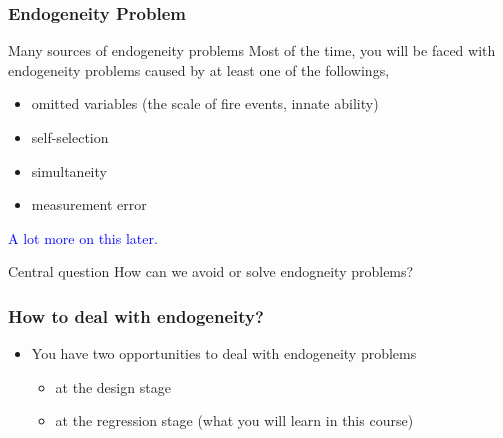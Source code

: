 \documentclass[fleqn]{beamer}\usepackage[]{graphicx}\usepackage[]{color}
\begin{document}
\begin{frame}[c]
  \frametitle{Endogeneity Problem}
  \begin{block}{Many sources of endogeneity problems}
  Most of the time, you will be faced with endogeneity problems caused by at least one of the followings,
  \begin{itemize}
    \item omitted variables (the scale of fire events, innate ability)
    \item self-selection
    \item simultaneity
    \item measurement error
  \end{itemize}
  \textcolor{blue}{A lot more on this later.}
  \end{block}
  \begin{block}{Central question}
    How can we avoid or solve endogneity problems?
  \end{block}
\end{frame}

\begin{frame}[c]
  \frametitle{How to deal with endogeneity?}
  \begin{itemize}
    \item You have two opportunities to deal with endogeneity problems
  \begin{itemize}
    \item at the design stage
    \item at the regression stage (what you will learn in this course)
  \end{itemize}

  \end{itemize}
\end{frame}
\end{document}
